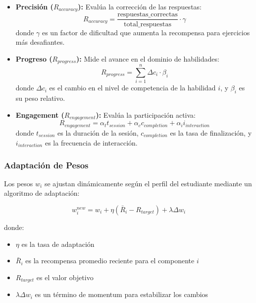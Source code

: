 \begin{itemize}
	\item \textbf{Precisión ($R_{accuracy}$):} Evalúa la corrección de las respuestas:
	      \begin{equation}
		      R_{accuracy} = \frac{\text{respuestas\_correctas}}{\text{total\_respuestas}} \cdot \gamma
	      \end{equation}
	      donde $\gamma$ es un factor de dificultad que aumenta la recompensa para ejercicios más desafiantes.

	\item \textbf{Progreso ($R_{progress}$):} Mide el avance en el dominio de habilidades:
	      \begin{equation}
		      R_{progress} = \sum_{i=1}^n \Delta c_i \cdot \beta_i
	      \end{equation}
	      donde $\Delta c_i$ es el cambio en el nivel de competencia de la habilidad $i$, y $\beta_i$ es su peso relativo.

	\item \textbf{Engagement ($R_{engagement}$):} Evalúa la participación activa:
	      \begin{equation}
		      R_{engagement} = \alpha_t t_{session} + \alpha_c c_{completion} + \alpha_i i_{interaction}
	      \end{equation}
	      donde $t_{session}$ es la duración de la sesión, $c_{completion}$ es la tasa de finalización, y $i_{interaction}$ es la frecuencia de interacción.
\end{itemize}

\subsubsection{Adaptación de Pesos}

Los pesos $w_i$ se ajustan dinámicamente según el perfil del estudiante mediante un algoritmo de adaptación:

\begin{equation}
	w_i^{new} = w_i + \eta(\bar{R}_i - R_{target}) + \lambda\Delta w_i
\end{equation}

donde:
\begin{itemize}
	\item $\eta$ es la tasa de adaptación
	\item $\bar{R}_i$ es la recompensa promedio reciente para el componente $i$
	\item $R_{target}$ es el valor objetivo
	\item $\lambda\Delta w_i$ es un término de momentum para estabilizar los cambios
\end{itemize}

